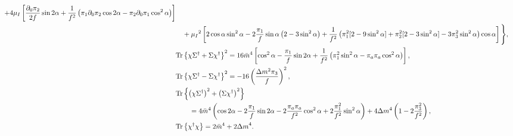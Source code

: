 \begin{align}
        + 4 \mu_I 
        \left[
            \frac{\partial_0 \pi_2}{2 f} \sin{2\alpha}
            + \frac{1}{f^2}
            \left(
                \pi_1 \partial_0 \pi_2 \cos{2\alpha}
                - \pi_2 \partial_0 \pi_1\cos^2{\alpha}
            \right)
        \right]\\\notag
        & \quad + \mu_I{}^2
        \left[
            2\cos{\alpha}\sin^2{\alpha} 
            - 2 \frac{\pi_1}{f} \sin{\alpha}
            \left(2 - 3\sin^2{\alpha}\right)
            + \frac{1}{f^2}
            \left(                
                \pi_1^2[2 - 9 \sin^2{\alpha}]
                + \pi_2^2 [2 - 3 \sin^2{\alpha}]
                - 3\pi_3^2\sin^2{\alpha}
            \right)
            \cos{\alpha}
        \right]
    \Bigg\}, \\
    \label{l3}
    & \text{Tr} \left\{ \chi \Sigma^\dagger + \Sigma \chi^\dagger  \right\}^2
    = 16 \bar m^4
    \left[
        \cos^2{\alpha} 
        - \frac{\pi_1}{f} \sin{2\alpha}
        + \frac{1}{f^2}\left(\pi_1^2 \sin^2{\alpha} - \pi_a \pi_a \cos^2{\alpha}\right)
    \right], \\
    \label{l7}
    & \text{Tr} \left\{ \chi \Sigma^\dagger - \Sigma \chi^\dagger  \right\}^2
     = - 16 \left( \frac{\Delta m^2 \pi_3}{f} \right)^2, \\
    \notag
    & \text{Tr} \left\{ \left(\chi \Sigma^\dagger\right)^2 + \left(\Sigma \chi^\dagger \right)^2 \right\}
    \\\label{h3}
    & \quad \quad = 4 \bar m^4
    \left(
        \cos{2\alpha} 
        - 2\frac{\pi_1}{f} \sin{2\alpha}
        - 2\frac{\pi_a \pi_a}{f^2} \cos^2{\alpha}
        + 2\frac{\pi_1^2}{f^2} \sin^2{\alpha}
    \right)
    + 4 \Delta m^4
    \left(
        1- 2\frac{ \pi_3^2}{f^2}
    \right)
    , \\
    \label{h2}
    & \text{Tr} \left\{ \chi^\dagger \chi \right\} = 2 {\bar m}^4 + 2{\Delta m}^4.
\end{align}
%

\endgroup

